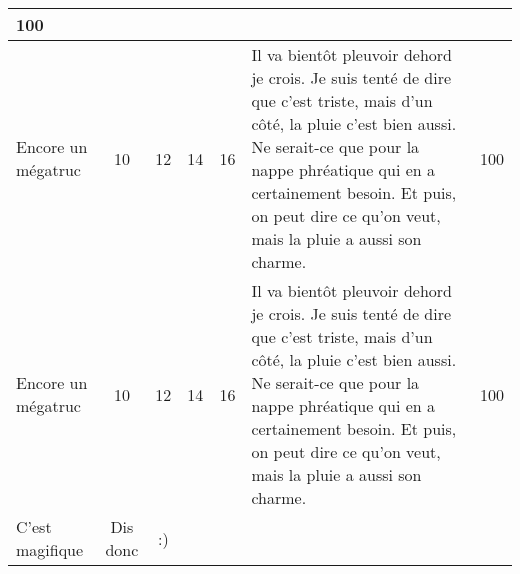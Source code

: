 \documentclass[etudiants]{support-iutrs}
\begin{document}
\begin{landscape}
\begin{longtable}{||l|c|c|c|c|p{9cm}|c||}
	100 \\
\hline 
Encore un mégatruc &
	10 &
	12 &
	14 &
	16 &
	Il va bientôt pleuvoir dehord je crois. Je suis tenté de dire que c'est triste, mais d'un côté, la pluie c'est bien aussi. Ne serait-ce que pour la nappe phréatique qui en a certainement besoin. Et puis, on peut dire ce qu'on veut, mais la pluie a aussi son charme. &
	100 \\
\hline 
Encore un mégatruc &
	10 &
	12 &
	14 &
	16 &
	Il va bientôt pleuvoir dehord je crois. Je suis tenté de dire que c'est triste, mais d'un côté, la pluie c'est bien aussi. Ne serait-ce que pour la nappe phréatique qui en a certainement besoin. Et puis, on peut dire ce qu'on veut, mais la pluie a aussi son charme. &
	100 \\
\hline 
C'est magifique &
Dis donc & 
:) \\ 
\hline
\end{longtable}

\end{landscape}
\end{document}
